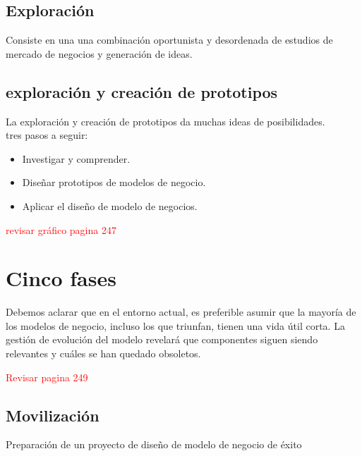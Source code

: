\documentclass[11pt]{book}
\begin{document}
\section{Exploración}
Consiste en una una combinación oportunista y desordenada de estudios de mercado de negocios y generación de ideas. 
\section{exploración y creación de prototipos}
La exploración y creación de prototipos da muchas ideas de posibilidades.
\\ tres pasos a seguir:
\begin{itemize}
\item Investigar y comprender.
\item Diseñar prototipos de modelos de negocio.
\item Aplicar el diseño de modelo de negocios.
\end{itemize}
\textcolor{red}{revisar gráfico pagina 247}
\chapter{Cinco fases}
Debemos aclarar que en el entorno actual, es preferible asumir que la mayoría de los modelos de negocio, incluso los que triunfan, tienen una vida útil corta. La gestión de evolución del modelo revelará que componentes siguen siendo relevantes y cuáles se han quedado obsoletos.

\textcolor{red}{Revisar pagina 249}
\section{Movilización}
Preparación de un proyecto de diseño de modelo de negocio de éxito
\end{document}
